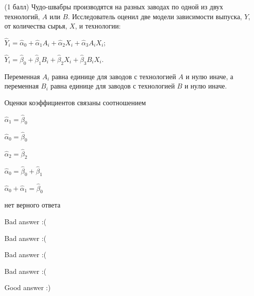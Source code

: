 
\begin{question}
(1 балл) Чудо-швабры производятся на разных заводах по одной из двух технологий,
\(A\) или \(B\). Исследователь оценил две модели зависимости выпуска,
\(Y\), от количества сырья, \(X\), и технологии:

\(\hat Y_i = \hat \alpha_0 + \hat\alpha_1 A_i + \hat\alpha_2 X_i + \hat\alpha_3 A_i X_i\);

\(\hat Y_i = \hat \beta_0 + \hat\beta_1 B_i + \hat\beta_2 X_i + \hat\beta_3 B_i X_i\).

Переменная \(A_i\) равна единице для заводов с технологией \(A\) и нулю
иначе, а переменная \(B_i\) равна единице для заводов с технологией
\(B\) и нулю иначе.

Оценки коэффициентов связаны соотношением
\begin{answerlist}
  \item \(\hat\alpha_1 = \hat\beta_0\)
  \item \(\hat\alpha_0 = \hat\beta_0\)
  \item \(\hat\alpha_2 = \hat\beta_2\)
  \item \(\hat\alpha_0 = \hat\beta_0 + \hat\beta_1\)
  \item \(\hat\alpha_0 + \hat\alpha_1 = \hat\beta_0\)
  \item нет верного ответа
\end{answerlist}
\end{question}

\begin{solution}
\begin{answerlist}
  \item Bad answer :(
  \item Bad answer :(
  \item Bad answer :(
  \item Bad answer :(
  \item Good answer :)
\end{answerlist}
\end{solution}
